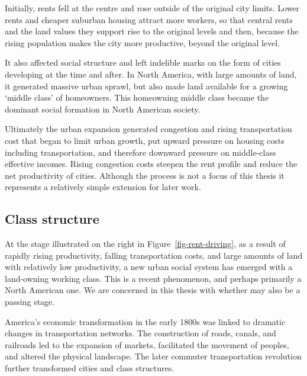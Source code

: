 
Initially, rents fell at the centre and rose outside of the original city limits. Lower rents and cheaper suburban housing attract more workers, so that central rents and the land values they support  rise to the original levels and then, because the rising population makes the city more productive, beyond the original level. 

It  also affected social structure and left indelible marks on the form of cities developing at the time and after. In North America, with large amounts of land, it generated massive urban sprawl, but also made land available for a growing `middle class' of homeowners. This homeowning middle class became the dominant social formation in North 
American society. 

Ultimately the urban expansion generated congestion and rising transportation cost that began to limit urban growth, put upward pressure on  housing costs including transportation, and therefore downward pressure on middle-class effective incomes. Rising congestion costs steepen the rent profile and  reduce the net productivity of cities. Although the process is not a focus of this thesis it represents a relatively simple extension for later work.



\subsection{Class structure}\label{sec-class-structure}

At the stage illustrated on the right  in Figure~\ref{fig-rent-driving},  %
as a result of rapidly rising productivity, falling transportation costs, and large amounts of land with relatively low productivity, a new urban social system has emerged with a land-owning working class. This is a recent phenomenon, and perhaps primarily a North American one. We are concerned in this thesis with whether may also be a passing stage.

America's economic transformation in the early 1800s was linked to dramatic changes in transportation networks. The construction of roads, canals, and railroads led to the expansion of markets, facilitated the movement of peoples, and altered the physical landscape. The later commuter transportation revolution  further transformed cities and class structures.

